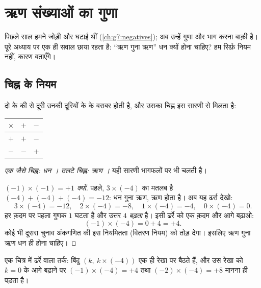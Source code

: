 \chapter{ऋण संख्याओं का गुणा}\label{ch:g8:negprod}

पिछले साल हमने  जोड़ी और घटाई थीं
(\cref{ch:g7:negatives}); अब उन्हें गुणा और भाग करना बाक़ी है। पूरे
अध्याय पर एक ही सवाल छाया रहता है: ``ऋण गुना ऋण'' धन क्यों होना
चाहिए? हम सिर्फ़ नियम नहीं, कारण बताएँगे।

\section{चिह्न के नियम}

\begin{theorem}[गुणनफल का चिह्न]\label{thm:g8:negprod:rules}
दो  के  की  से दूरी उनकी दूरियों के
 के बराबर होती है, और उसका चिह्न इस सारणी से मिलता है:
\begin{center}
\renewcommand{\arraystretch}{1.3}
\begin{tabular}{c|cc}
$\times$ & $+$ & $-$ \\
\hline
$+$ & $+$ & $-$ \\
$-$ & $-$ & $+$ \\
\end{tabular}
\end{center}
\emph{एक जैसे चिह्न: धन । उलटे चिह्न: ऋण ।}
यही सारणी भागफलों पर भी चलती है।
\end{theorem}

\begin{proof}[$(-1) \times (-1) = +1$ क्यों]
पहले, $3 \times (-4)$ का मतलब है $(-4) + (-4) + (-4) = -12$: धन गुना
ऋण, ऋण होता है। अब यह ढर्रा देखो:
\[
3 \times (-4) = -12, \quad
2 \times (-4) = -8, \quad
1 \times (-4) = -4, \quad
0 \times (-4) = 0 .
\]
हर क़दम पर पहला गुणक $1$ घटता है और उत्तर $4$ \emph{बढ़ता} है। इसी
ढर्रे को एक क़दम और आगे बढ़ाओ:
\[
(-1) \times (-4) = 0 + 4 = +4 .
\]
कोई भी दूसरा चुनाव अंकगणित की इस नियमितता (वितरण नियम) को तोड़ देगा।
इसलिए ऋण गुना ऋण धन ही होना चाहिए।
\end{proof}

\begin{omfigure}

{\small एक चित्र में ढर्रे वाला तर्क: बिंदु $(k,\ k \times (-4))$ एक
ही रेखा पर बैठते हैं, और उस रेखा को $k = 0$ के आगे बढ़ाने पर
$(-1)\times(-4) = +4$ तथा $(-2)\times(-4) = +8$ मानना ही पड़ता है।}
\end{omfigure}

